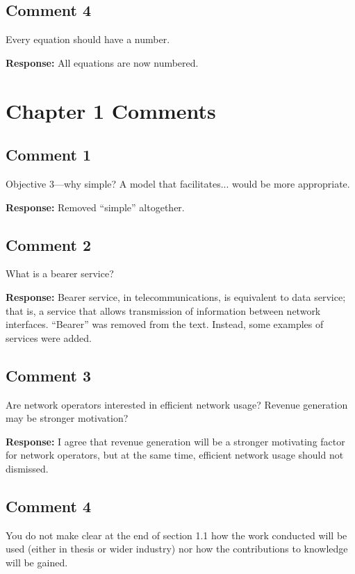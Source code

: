 \documentclass[10pt,a4paper,notitlepage]{article}
\numberwithin{equation}{section}
\begin{document}
\subsection{Comment 4}
Every equation should have a number.

\textbf{Response:}
All equations are now numbered.

\clearpage

\setcounter{section}{0}
\renewcommand{\thesection}{C\arabic{section}}
\renewcommand{\thesubsection}{C\arabic{section}.\arabic{subsection}}
\section{Chapter 1 Comments}
\subsection{Comment 1}
Objective 3---why simple? A model that facilitates... would be more appropriate.

\textbf{Response:}
Removed ``simple'' altogether.

\subsection{Comment 2}
What is a bearer service?

\textbf{Response:}
Bearer service, in telecommunications, is equivalent to data service; that is, a service that allows transmission of information between network interfaces. ``Bearer'' was removed from the text. Instead, some examples of services were added.

\subsection{Comment 3}
Are network operators interested in efficient network usage? Revenue generation may be stronger motivation?

\textbf{Response:}
I agree that revenue generation will be a stronger motivating factor for network operators, but at the same time, efficient network usage should not dismissed.

\subsection{Comment 4}
You do not make clear at the end of section 1.1 how the work conducted will be used (either in thesis or wider industry) nor how the contributions to knowledge will be gained.
\end{document}

